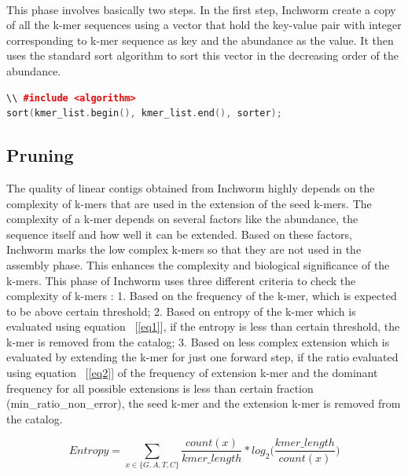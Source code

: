 \label{key}\documentclass[bachinf, english ,zihtitle,final,hyperref,utf8]{zihpub}
\begin{document}
\paragraph{}
This phase involves basically two steps. In the first step, Inchworm create a copy of all the k-mer sequences using a vector that hold the key-value pair with integer corresponding to k-mer sequence as key and the abundance as the value. It then uses the standard sort algorithm to sort this vector in the decreasing order of the abundance. 
\begin{lstlisting}[language=C++]
\\ #include <algorithm>
sort(kmer_list.begin(), kmer_list.end(), sorter);
\end{lstlisting}
\subsection{Pruning}
The quality of linear contigs obtained from Inchworm highly depends on the complexity of k-mers that are used in the extension of the seed k-mers. The complexity of a k-mer depends on several factors like the abundance, the sequence itself and how well it can be extended. Based on these factors, Inchworm marks the low complex k-mers so that they are not used in the assembly phase. This enhances the complexity and biological significance of the k-mers. This phase of Inchworm uses three different criteria to check the complexity of k-mers : 1. Based on the frequency of the k-mer, which is expected to be above certain threshold; 2. Based on entropy of the k-mer which is evaluated using equation ~[\ref{eq1}], if the entropy is less than certain threshold, the k-mer is removed from the catalog; 3. Based on less complex extension which is evaluated by extending the k-mer for just one forward step, if the ratio evaluated using equation ~[\ref{eq2}] of the frequency of extension k-mer and the dominant frequency for all possible extensions is less than certain fraction (min\_ratio\_non\_error), the seed k-mer and the extension k-mer is removed from the catalog.

\begin{equation}
Entropy = \sum_{x \in \{G,A,T,C\}} \frac{count(x)}{kmer\_length}  * log_2 \bigg(\frac{kmer\_length}{count(x)} \bigg ) 
\label{eq1}
\end{equation}
\end{document}
